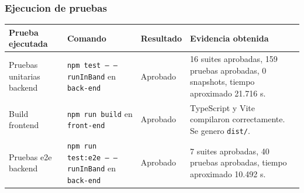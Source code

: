 \documentclass{article}
\newcommand{\estadoOK}{\textcolor{green!50!black}{Aprobado}}
\begin{document}
\subsubsection{Ejecucion de pruebas}
\begin{longtable}{p{4.0cm} p{4.0cm} p{3.0cm} p{4.0cm}}
    \toprule
    \textbf{Prueba ejecutada} & \textbf{Comando}                                              & \textbf{Resultado} & \textbf{Evidencia obtenida}                                                          \\
    \midrule
    Pruebas unitarias backend & \texttt{npm test -- --runInBand} en \texttt{back-end}         & \estadoOK          & 16 suites aprobadas, 159 pruebas aprobadas, 0 snapshots, tiempo aproximado 21.716 s. \\
    Build frontend            & \texttt{npm run build} en \texttt{front-end}                  & \estadoOK          & TypeScript y Vite compilaron correctamente. Se genero \texttt{dist/}.                \\
    Pruebas e2e backend       & \texttt{npm run test:e2e -- --runInBand} en \texttt{back-end} & \estadoOK          & 7 suites aprobadas, 40 pruebas aprobadas, tiempo aproximado 10.492 s.                \\
    \bottomrule
\end{longtable}
\end{document}
